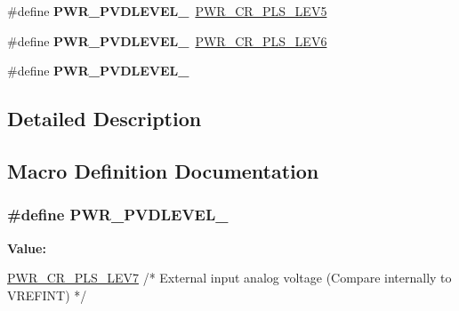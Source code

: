 \begin{DoxyCompactItemize}
\item 
\hypertarget{group___p_w_r___p_v_d__detection__level_ga46a1476440945c2b6426b4973172f24b}{\#define {\bfseries P\-W\-R\-\_\-\-P\-V\-D\-L\-E\-V\-E\-L\-\_}~\hyperlink{group___peripheral___registers___bits___definition_ga326781d09a07b4d215424fbbae11b7b2}{P\-W\-R\-\_\-\-C\-R\-\_\-\-P\-L\-S\-\_\-\-L\-E\-V5}}\label{group___p_w_r___p_v_d__detection__level_ga46a1476440945c2b6426b4973172f24b}

\item 
\hypertarget{group___p_w_r___p_v_d__detection__level_ga5dda7d0ac3fd3d606666455ca3c8f537}{\#define {\bfseries P\-W\-R\-\_\-\-P\-V\-D\-L\-E\-V\-E\-L\-\_}~\hyperlink{group___peripheral___registers___bits___definition_gaaff17e9c7fe7d837523b1e9a2f4e9baf}{P\-W\-R\-\_\-\-C\-R\-\_\-\-P\-L\-S\-\_\-\-L\-E\-V6}}\label{group___p_w_r___p_v_d__detection__level_ga5dda7d0ac3fd3d606666455ca3c8f537}

\item 
\#define {\bfseries P\-W\-R\-\_\-\-P\-V\-D\-L\-E\-V\-E\-L\-\_}
\end{DoxyCompactItemize}


\subsection{Detailed Description}


\subsection{Macro Definition Documentation}
\hypertarget{group___p_w_r___p_v_d__detection__level_ga2c5cd8dd26b13bdf0164c1f7596b4bfd}{
\subsubsection[{P\-W\-R\-\_\-\-P\-V\-D\-L\-E\-V\-E\-L\-\_\-7}]{\setlength{\rightskip}{0pt plus 5cm}\#define P\-W\-R\-\_\-\-P\-V\-D\-L\-E\-V\-E\-L\-\_}}\label{group___p_w_r___p_v_d__detection__level_ga2c5cd8dd26b13bdf0164c1f7596b4bfd}
{\bfseries Value\-:}
\begin{DoxyCode}
\hyperlink{group___peripheral___registers___bits___definition_ga95e3b301b5470ae94d32c53a9fbdfc8b}{PWR\_CR\_PLS\_LEV7}  \textcolor{comment}{/* External input analog voltage }
\textcolor{comment}{                                                            (Compare internally to VREFINT) */}
\end{DoxyCode}
